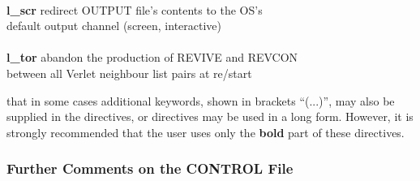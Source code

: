 \begin{tabbing}
\>                                              \> \\
\> {\bf l\_scr}                                 \> redirect OUTPUT file's contents to the OS's \\
\>                                              \> default output channel (screen, interactive) \\
\>                                              \> \\
\> {\bf l\_tor}                                 \> abandon the production of REVIVE and REVCON \\
\>                                              \> between all Verlet neighbour list pairs at re/start
\end{tabbing}

 that in some cases additional keywords, shown in
brackets ``(...)'', may also be supplied in the directives, or
directives may be used in a long form.  However, it is strongly
recommended that the user uses only the {\bf bold} part of these
directives.

\begin{table}[htbp]
\end{table}

\subsubsection{Further Comments on the CONTROL File}

